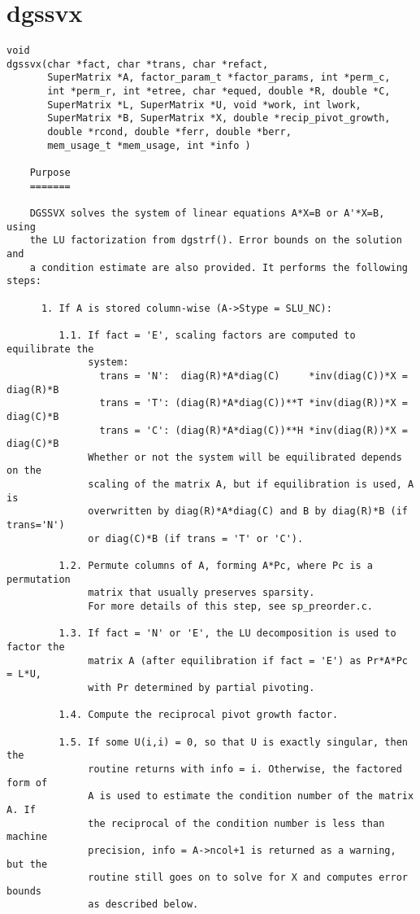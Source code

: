 \section{dgssvx}
\begin{verbatim}
void
dgssvx(char *fact, char *trans, char *refact,
       SuperMatrix *A, factor_param_t *factor_params, int *perm_c,
       int *perm_r, int *etree, char *equed, double *R, double *C,
       SuperMatrix *L, SuperMatrix *U, void *work, int lwork,
       SuperMatrix *B, SuperMatrix *X, double *recip_pivot_growth, 
       double *rcond, double *ferr, double *berr, 
       mem_usage_t *mem_usage, int *info )

    Purpose
    =======
   
    DGSSVX solves the system of linear equations A*X=B or A'*X=B, using
    the LU factorization from dgstrf(). Error bounds on the solution and
    a condition estimate are also provided. It performs the following steps:
   
      1. If A is stored column-wise (A->Stype = SLU_NC):
     
         1.1. If fact = 'E', scaling factors are computed to equilibrate the
              system:
                trans = 'N':  diag(R)*A*diag(C)     *inv(diag(C))*X = diag(R)*B
                trans = 'T': (diag(R)*A*diag(C))**T *inv(diag(R))*X = diag(C)*B
                trans = 'C': (diag(R)*A*diag(C))**H *inv(diag(R))*X = diag(C)*B
              Whether or not the system will be equilibrated depends on the
              scaling of the matrix A, but if equilibration is used, A is
              overwritten by diag(R)*A*diag(C) and B by diag(R)*B (if trans='N')
              or diag(C)*B (if trans = 'T' or 'C').
   
         1.2. Permute columns of A, forming A*Pc, where Pc is a permutation
              matrix that usually preserves sparsity.
              For more details of this step, see sp_preorder.c.
   
         1.3. If fact = 'N' or 'E', the LU decomposition is used to factor the
              matrix A (after equilibration if fact = 'E') as Pr*A*Pc = L*U,
              with Pr determined by partial pivoting.
   
         1.4. Compute the reciprocal pivot growth factor.
   
         1.5. If some U(i,i) = 0, so that U is exactly singular, then the
              routine returns with info = i. Otherwise, the factored form of 
              A is used to estimate the condition number of the matrix A. If
              the reciprocal of the condition number is less than machine
              precision, info = A->ncol+1 is returned as a warning, but the
              routine still goes on to solve for X and computes error bounds
              as described below.
   

\end{verbatim}
